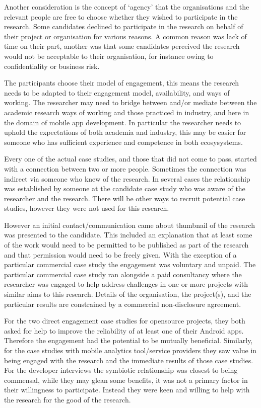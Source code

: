 
Another consideration is the concept of `agency' that the organisations and the relevant people are free to choose whether they wished to participate in the research. Some candidates declined to participate in the research on behalf of their project or organisation for various reasons. A common reason was lack of time on their part, another was that some candidates perceived the research would not be acceptable to their organisation, for instance owing to confidentiality or business risk.

The participants choose their model of engagement, this means the research needs to be adapted to their engagement model, availability, and ways of working. The researcher may need to bridge between and/or mediate between the academic research ways of working and those practiced in industry, and here in the domain of mobile app development. In particular the researcher needs to uphold the expectations of both academia and industry, this may be easier for someone who has sufficient experience and competence in both ecosysystems.


Every one of the actual case studies, and those that did not come to pass, started with a connection between two or more people. Sometimes the connection was indirect via someone who knew of the research. In several cases the relationship was established by someone at the candidate case study who was aware of the researcher and the research. There will be other ways to recruit potential case studies, however they were not used for this research.

However an initial contact/communication came about thumbnail of the research was presented to the candidate. This included an explanation that at least some of the work would need to be permitted to be published as part of the research and that permission would need to be freely given. With the exception of a particular commercial case study the engagement was voluntary and unpaid. The particular commercial case study ran alongside a paid consultancy where the researcher was engaged to help address challenges in one or more projects with similar aims to this research. Details of the organisation, the project(s), and the particular results are constrained by a commercial non-disclosure agreement.

For the two direct engagement case studies for opensource projects, they both asked for help to improve the reliability of at least one of their Android apps. Therefore the engagement had the potential to be mutually beneficial. Similarly, for the case studies with mobile analytics tool/service providers they saw value in being engaged with the research and the immediate results of those case studies. For the developer interviews the symbiotic relationship was closest to being commensal, while they may glean some benefits, it was not a primary factor in their willingness to participate. Instead they were keen and willing to help with the research for the good of the research. 


